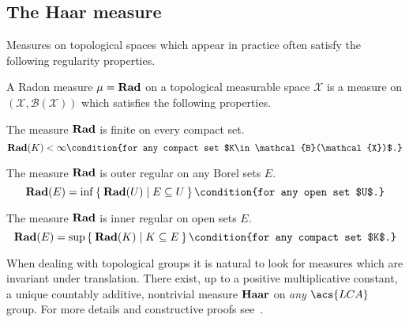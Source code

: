 \subsection{The Haar measure}
Measures on topological spaces which appear in practice often satisfy the following regularity properties.
\begin{definition}
A Radon measure $\mu=\mathbf{Rad}$ on a topological measurable space $\mathcal{X}$ is a measure on
$(\mathcal{X}, \mathcal{B}(\mathcal{X}))$ which satisfies the following properties.
\begin{propenum}
\item The measure $\mathbf{Rad}$ is finite on every compact set.
\begin{dmath*}
\Radon(K) < \infty\condition{for any compact set $K\in\mathcal{B}(\mathcal{X})$.}
\end{dmath*}
\item The measure $\mathbf{Rad}$ is outer regular on any Borel sets $E$.
\begin{dmath*}
\Radon(E)=\inf \Set{\Radon(U) | E\subseteq U}\condition{for any open set $U$.}
\end{dmath*}
\item The measure $\mathbf{Rad}$ is inner regular on open sets $E$.
\begin{dmath*}
\Radon(E)=\sup\Set{\Radon(K) | K\subseteq E}\condition{for any compact set $K$.}
\end{dmath*}
\end{propenum}
\end{definition}

When dealing with topological groups it is natural to look for measures which
are invariant under translation. There exist, up to a positive multiplicative constant, a unique countably additive, nontrivial measure $\mathbf{Haar}$ on \emph{any} $\acs{LCA}$ group. For more details and constructive proofs see~\cite{alfsen1964simplified,folland1994course,conway2013course}.


